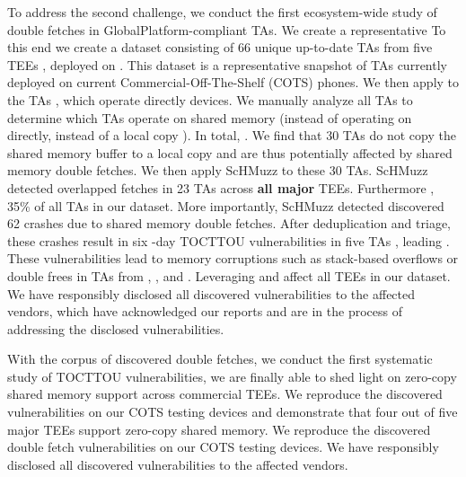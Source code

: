 \documentclass[conference]{IEEEtran} %
\newcommand{\sysname}{ScHMuzz\xspace}
\newcommand{\mitee}{MiTEE\xspace}
\newcommand{\teegris}{TEEGris\xspace}
\newcommand{\qsee}{QSEE\xspace}
\newcommand{\numTAs}{66\xspace}
\newcommand{\numTAsharnessed}{30\xspace}
\newcommand{\numTEEs}{five\xspace}
\newcommand{\numTAsdf}{23\xspace}
\newcommand{\numdfsmerge}{17,232\xspace}
\newcommand{\numcrashesdistill}{62\xspace}
\newcommand{\numvulns}{six\xspace}
\newcommand{\numvulnTAs}{five\xspace}
\providecommand{\DIFaddtex}[1]{{\protect\color{blue} \sf #1}} %
\providecommand{\DIFdeltex}[1]{{\protect\color{red} \scriptsize #1}} %
\providecommand{\DIFaddbegin}{} %
\providecommand{\DIFaddend}{} %
\providecommand{\DIFdelbegin}{} %
\providecommand{\DIFdelend}{} %
\providecommand{\DIFadd}[1]{\texorpdfstring{\DIFaddtex{#1}}{#1}} %
\providecommand{\DIFdel}[1]{\texorpdfstring{\DIFdeltex{#1}}{}} %
\begin{document}
\DIFadd{To address the second challenge, we conduct the first ecosystem-wide study of 
double fetches in }\DIFaddend GlobalPlatform-compliant TAs.
\DIFdelbegin \DIFdel{We create a representative }\DIFdelend \DIFaddbegin \DIFadd{To this end we create a }\DIFaddend dataset consisting of 
\numTAs{} \DIFaddbegin \DIFadd{unique }\DIFaddend up-to-date TAs from \numTEEs{} TEEs\DIFdelbegin \DIFdel{, deployed on }\DIFdelend \DIFaddbegin \DIFadd{.
This dataset is a representative snapshot of TAs currently deployed on current 
}\DIFaddend Commercial-Off-The-Shelf (COTS) \DIFdelbegin \DIFdel{phones. We then apply }%
\DIFdel{to the }%
\DIFdel{TAs , which operate directly }\DIFdelend \DIFaddbegin \DIFadd{devices. We manually analyze all TAs to determine 
which TAs operate }\DIFaddend on shared memory \DIFdelbegin \DIFdel{(instead of operating on }\DIFdelend \DIFaddbegin \DIFadd{directly, instead of }\DIFaddend a local copy\DIFdelbegin \DIFdel{). In total, }\DIFdelend \DIFaddbegin \DIFadd{. We find that 
}\numTAsharnessed{} \DIFadd{TAs do not copy the shared memory buffer to a local copy and are 
thus potentially affected by shared memory double fetches. 
We then apply }\sysname \DIFadd{to these }\numTAsharnessed{} \DIFadd{TAs.
}\DIFaddend \sysname detected \DIFdelbegin %
\DIFdelend overlapped fetches in \numTAsdf TAs\DIFdelbegin \DIFdel{across }\textbf{\DIFdel{all major}} %
\DIFdel{TEEs.
Furthermore}\DIFdelend \DIFaddbegin \DIFadd{, 35\% of all TAs in our dataset.
More importantly}\DIFaddend , \sysname \DIFdelbegin \DIFdel{detected 
}\DIFdelend \DIFaddbegin \DIFadd{discovered }\numcrashesdistill{} \DIFadd{crashes due to shared memory double fetches.
After deduplication and triage, these crashes result in }\DIFaddend \numvulns{} \DIFaddbegin \DIFadd{0-day }\DIFaddend TOCTTOU 
vulnerabilities in \numvulnTAs{} TAs\DIFdelbegin \DIFdel{, leading }\DIFdelend \DIFaddbegin \DIFadd{. These vulnerabilities lead }\DIFaddend to memory corruptions such as 
stack-based overflows or double frees \DIFdelbegin \DIFdel{in TAs from }%
\DIFdel{, }%
\DIFdel{, and }%
\DIFdel{.
Leveraging }\DIFdelend \DIFaddbegin \DIFadd{and affect all TEEs in our dataset.
We have responsibly disclosed all discovered vulnerabilities to the affected vendors, which 
have acknowledged our reports and are in the process of addressing the disclosed 
vulnerabilities.
}

\DIFadd{With }\DIFaddend the corpus of discovered \DIFdelbegin \DIFdel{double fetches, we conduct the first systematic study of 
}\DIFdelend \DIFaddbegin \DIFadd{TOCTTOU vulnerabilities, we are finally able to shed light on  
}\DIFaddend zero-copy shared memory support across commercial TEEs. We \DIFaddbegin \DIFadd{reproduce the discovered 
vulnerabilities on our COTS testing devices and }\DIFaddend demonstrate that four out of five major 
TEEs support zero-copy shared memory.
\DIFdelbegin \DIFdel{We reproduce the discovered double fetch vulnerabilities on our COTS testing devices. 
We have responsibly disclosed all discovered vulnerabilities to the affected vendors.
}\DIFdelend 
\end{document}
